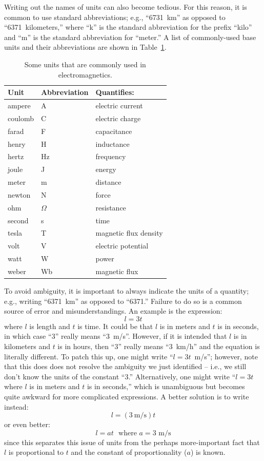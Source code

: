 Writing out the names of units can also become tedious.
For this reason, it is common to use standard abbreviations; e.g., ``6731~km'' as opposed to ``6371~kilometers,'' where ``k'' is the standard abbreviation for the prefix ``kilo'' and ``m'' is the standard abbreviation for ``meter.''
A list of commonly-used base units and their abbreviations are shown in Table~\ref{m0072_tUnits}.
%
\begin{table}
\begin{center}
\begin{tabular}{lll}
Unit & Abbreviation & Quantifies: \\
\hline
ampere & A & electric current \\
coulomb & C & electric charge\\
farad & F & capacitance \\
henry & H & inductance \\
hertz & Hz & frequency\\
joule & J & energy \\
meter & m & distance \\
newton & N & force \\
ohm & $\Omega$ & resistance\\
second & s & time\\
tesla & T & magnetic flux density \\
volt & V & electric potential\\
watt & W & power\\
weber & Wb & magnetic flux \\
\end{tabular}
\end{center}
\caption{Some units that are commonly used in electromagnetics.  
}
\label{m0072_tUnits}
\end{table}

To avoid ambiguity, it is important to always indicate the units of a quantity; e.g., writing ``6371~km'' as opposed to ``6371.''
Failure to do so is a common source of error and misunderstandings.  
An example is the expression: 
$$l = 3t$$ 
where $l$ is length and $t$ is time.  It could be that $l$ is in meters and $t$ is in seconds, in which case ``$3$'' really means ``3~m/s''.
However, if it is intended that $l$ is in kilometers and $t$ is in hours, then ``$3$'' really means ``3~km/h'' and the equation is literally different.
To patch this up, one might write ``$l = 3t$~m/s''; however, note that this does does not resolve the ambiguity we just identified -- i.e., we still don't know the units of the constant ``3.''
Alternatively, one might write ``$l=3t$ where $l$ is in meters and $t$ is in seconds,'' which is unambiguous but becomes quite awkward for more complicated expressions.
A better solution is to write instead:
$$l = \left(3~\mbox{m/s}\right)t$$
or even better:
$$l = at ~~~\mbox{where $a=3$~m/s}$$
since this separates this issue of units from the perhaps more-important fact that $l$ is proportional to $t$ and the constant of proportionality ($a$) is known.

